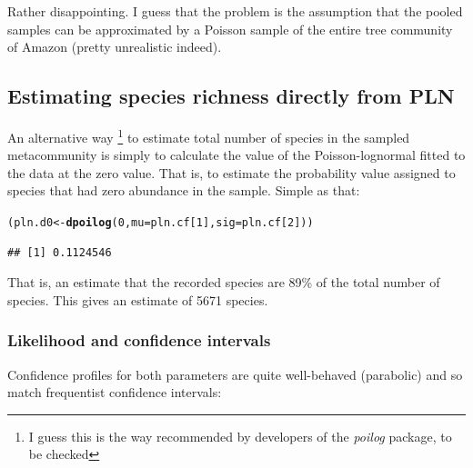 \documentclass[12pt, A4]{article}\usepackage[]{graphicx}\usepackage[]{color}
\makeatletter
\newcommand{\hlnum}[1]{\textcolor[rgb]{0.686,0.059,0.569}{#1}}%
\newcommand{\hlstd}[1]{\textcolor[rgb]{0.345,0.345,0.345}{#1}}%
\newcommand{\hlkwb}[1]{\textcolor[rgb]{0.69,0.353,0.396}{#1}}%
\newcommand{\hlkwc}[1]{\textcolor[rgb]{0.333,0.667,0.333}{#1}}%
\newcommand{\hlkwd}[1]{\textcolor[rgb]{0.737,0.353,0.396}{\textbf{#1}}}%
\newenvironment{kframe}{%
 \def\at@end@of@kframe{}%
 \ifinner\ifhmode%
  \def\at@end@of@kframe{\end{minipage}}%
  \begin{minipage}{\columnwidth}%
 \fi\fi%
 \def\FrameCommand##1{\hskip\@totalleftmargin \hskip-\fboxsep
 \colorbox{shadecolor}{##1}\hskip-\fboxsep
     \hskip-\linewidth \hskip-\@totalleftmargin \hskip\columnwidth}%
 \MakeFramed {\advance\hsize-\width
   \@totalleftmargin\z@ \linewidth\hsize
   \@setminipage}}%
 {\par\unskip\endMakeFramed%
 \at@end@of@kframe}
\newenvironment{knitrout}{}{} %
\makeatother
\begin{document}
Rather disappointing. I guess that the problem is the assumption that the pooled samples
can be approximated by a Poisson sample of the entire tree community of Amazon (pretty unrealistic indeed).


\subsection*{Estimating species richness directly from PLN}

An alternative way \footnote{I guess this is the way recommended by developers of the \emph{poilog} package, to be checked} 
to estimate total number of species in the sampled metacommunity
is simply to calculate the value of the Poisson-lognormal fitted to the data at
the zero value. That is, to estimate the probability value assigned to species that
had zero abundance in the sample. Simple as that:

\begin{knitrout}
\color{fgcolor}\begin{kframe}
\begin{alltt}
\hlstd{(pln.d0} \hlkwb{<-} \hlkwd{dpoilog}\hlstd{(}\hlnum{0}\hlstd{,} \hlkwc{mu} \hlstd{= pln.cf[}\hlnum{1}\hlstd{],} \hlkwc{sig}\hlstd{=pln.cf[}\hlnum{2}\hlstd{]))}
\end{alltt}
\begin{verbatim}
## [1] 0.1124546
\end{verbatim}
\end{kframe}
\end{knitrout}

That is, an estimate that the recorded species are 89\%
of the total number of species.
This gives an estimate of 5671 species.

\subsubsection*{Likelihood and confidence intervals}

Confidence profiles for both parameters are quite well-behaved (parabolic)
and so match frequentist confidence intervals:
\end{document}
